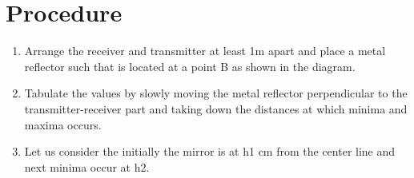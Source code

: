 \documentclass[
	letterpaper, %
	10pt, %
]{CSUniSchoolLabReport}
\begin{document}
\section{Procedure}
\begin{enumerate}
	\item Arrange the receiver and transmitter at least 1m apart and place a metal reflector such that is located at a point B as shown in the diagram. 
	\item Tabulate the values by slowly moving the metal reflector perpendicular to the transmitter-receiver part and taking down the distances at which minima and maxima occurs. 
	\item Let us consider the initially the mirror is at h1 cm from the center line and next minima occur at h2. 

\end{enumerate}
\vspace{1cm}
\end{document}
